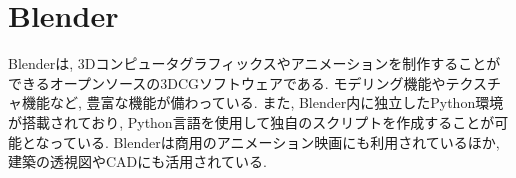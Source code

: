 \section{Blender}
Blenderは, 3Dコンピュータグラフィックスやアニメーションを制作することができるオープンソースの3DCGソフトウェアである.
モデリング機能やテクスチャ機能など, 豊富な機能が備わっている.
また, Blender内に独立したPython環境が搭載されており, Python言語を使用して独自のスクリプトを作成することが可能となっている.
Blenderは商用のアニメーション映画にも利用されているほか, 建築の透視図やCADにも活用されている.